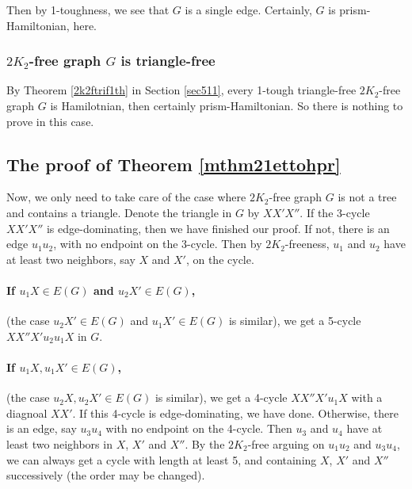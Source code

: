 \documentclass[12pt]{report}
\begin{document}
Then by 1-toughness, we see that $G$ is a single edge. Certainly, $G$ is prism-Hamiltonian, here.





\subsubsection{$2K_2$-free graph $G$ is triangle-free}
By Theorem \ref{2k2ftrif1th} in Section \ref{sec511}, every 1-tough triangle-free $2K_2$-free graph $G$ is Hamilotnian, then certainly prism-Hamiltonian. So there is nothing to prove in this case.








\subsection{The proof of Theorem \ref{mthm21ettohpr}}

Now, we only need to take care of the case where $2K_2$-free graph $G$ is not a tree and contains a triangle.
Denote the triangle in $G$ by $XX'X''$. If the 3-cycle $XX'X''$ is edge-dominating, then we have finished our proof. If not, there is an edge $u_1u_2$, with no endpoint on the 3-cycle. Then by $2K_2$-freeness, $u_1$ and $u_2$ have at least two neighbors, say $X$ and $X'$, on the cycle.

\paragraph{If $u_1X\in E(G)$ and $u_2X'\in E(G)$,} (the case $u_2X'\in E(G)$ and $u_1X'\in E(G)$ is similar), we get a 5-cycle $XX''X'u_2u_1X$ in $G$.

\paragraph{If $u_1X,u_1X'\in E(G)$,}(the case $u_2X,u_2X'\in E(G)$ is similar), we get a 4-cycle $XX''X'u_1X$ with a diagnoal $XX'$. If this 4-cycle is edge-dominating, we have done. Otherwise, there is an edge, say $u_3u_4$ with no endpoint on the 4-cycle. Then $u_3$ and $u_4$ have at least two neighbors in $X$, $X'$ and $X''$. By the $2K_2$-free arguing on $u_1u_2$ and $u_3u_4$, we can always get a cycle with length at least 5, and containing $X$, $X'$ and $X''$ successively (the order may be changed).
\end{document}
